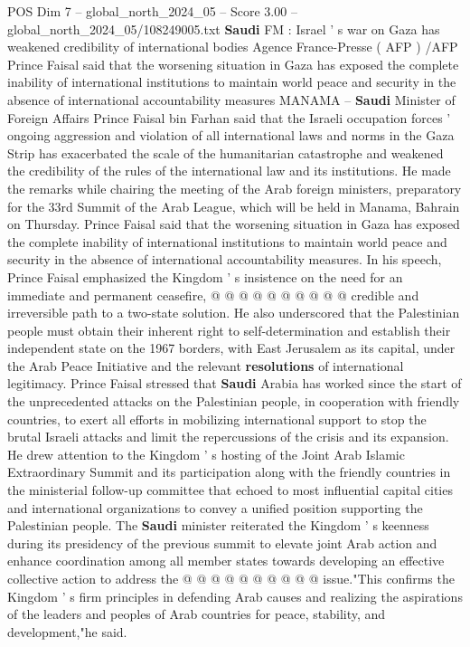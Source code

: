 \begin{textsample}{POS Dim 7 – global\_north\_2024\_05 – Score 3.00 – global\_north\_2024\_05/108249005.txt}  \label{ex:f7_pos_265}
\textbf{Saudi} FM : Israel ' s war on Gaza has weakened credibility of international bodies Agence France-Presse ( AFP ) /AFP Prince Faisal said that the worsening situation in Gaza has exposed the complete inability of international institutions to maintain world peace and security in the absence of international accountability measures MANAMA -- \textbf{Saudi} Minister of Foreign Affairs Prince Faisal bin Farhan said that the Israeli occupation forces ' ongoing aggression and violation of all international laws and norms in the Gaza Strip has exacerbated the scale of the humanitarian catastrophe and weakened the credibility of the rules of the international law and its institutions.
He made the remarks while chairing the meeting of the Arab foreign ministers, preparatory for the 33rd Summit of the Arab League, which will be held in Manama, Bahrain on Thursday.
Prince Faisal said that the worsening situation in Gaza has exposed the complete inability of international institutions to maintain world peace and security in the absence of international accountability measures.
In his speech, Prince Faisal emphasized the Kingdom ' s insistence on the need for an immediate and permanent ceasefire, @ @ @ @ @ @ @ @ @ @ credible and irreversible path to a two-state solution.
He also underscored that the Palestinian people must obtain their inherent right to self-determination and establish their independent state on the 1967 borders, with East Jerusalem as its capital, under the Arab Peace Initiative and the relevant \textbf{resolutions} of international legitimacy.
Prince Faisal stressed that \textbf{Saudi} Arabia has worked since the start of the unprecedented attacks on the Palestinian people, in cooperation with friendly countries, to exert all efforts in mobilizing international support to stop the brutal Israeli attacks and limit the repercussions of the crisis and its expansion.
He drew attention to the Kingdom ' s hosting of the Joint Arab Islamic Extraordinary Summit and its participation along with the friendly countries in the ministerial follow-up committee that echoed to most influential capital cities and international organizations to convey a unified position supporting the Palestinian people.
The \textbf{Saudi} minister reiterated the Kingdom ' s keenness during its presidency of the previous summit to elevate joint Arab action and enhance coordination among all member states towards developing an effective collective action to address the @ @ @ @ @ @ @ @ @ @ issue."This confirms the Kingdom ' s firm principles in defending Arab causes and realizing the aspirations of the leaders and peoples of Arab countries for peace, stability, and development,"he said.

\end{textsample}
